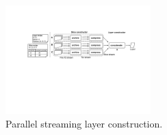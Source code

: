 
\begin{figure}[t]
	\centering
	\centering
	\includegraphics[width=0.5\textwidth]{graphs/sift-layer-construct.pdf}
	\caption{Parallel streaming layer construction.}
	\label{fig:construct}
\end{figure}

